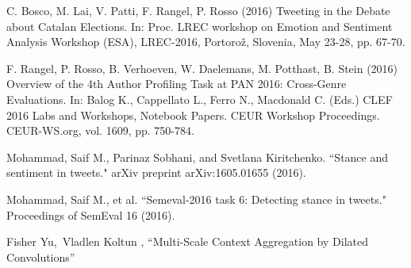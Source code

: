 \begin{thebibliography}{1}
C. Bosco, M. Lai, V. Patti, F. Rangel, P. Rosso (2016) Tweeting in the Debate about Catalan Elections. In: Proc. LREC workshop on Emotion and Sentiment Analysis Workshop (ESA), LREC-2016, Portorož, Slovenia, May 23-28, pp. 67-70.

F. Rangel, P. Rosso, B. Verhoeven, W. Daelemans, M. Potthast, B. Stein (2016) Overview of the 4th Author Profiling Task at PAN 2016: Cross-Genre Evaluations. In: Balog K., Cappellato L., Ferro N., Macdonald C. (Eds.) CLEF 2016 Labs and Workshops, Notebook Papers. CEUR Workshop Proceedings. CEUR-WS.org, vol. 1609, pp. 750-784.

Mohammad, Saif M., Parinaz Sobhani, and Svetlana Kiritchenko. ``Stance and sentiment in tweets." arXiv preprint arXiv:1605.01655 (2016).

Mohammad, Saif M., et al. ``Semeval-2016 task 6: Detecting stance in tweets." Proceedings of SemEval 16 (2016).

Fisher Yu, Vladlen Koltun , ``Multi-Scale Context Aggregation by Dilated Convolutions”


\end{thebibliography}